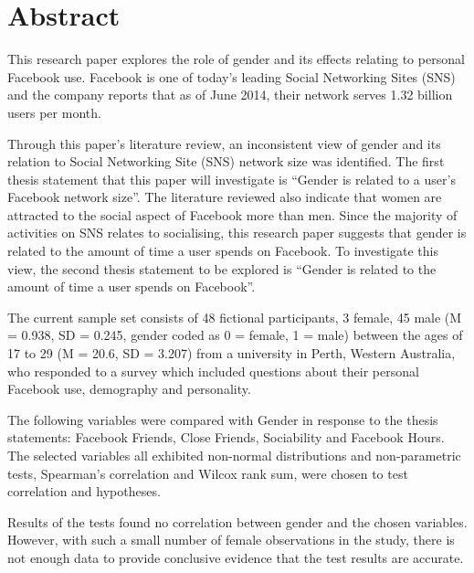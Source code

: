\section{Abstract}

This research paper explores the role of gender and its effects relating to personal Facebook use. Facebook is one of today's leading Social Networking Sites (SNS) and the company reports that as of June 2014, their network serves 1.32 billion users per month.

Through this paper's literature review, an inconsistent view of gender and its relation to Social Networking Site (SNS) network size was identified. The first thesis statement that this paper will investigate is ``Gender is related to a user's Facebook network size''. The literature reviewed also indicate that women are attracted to the social aspect of Facebook more than men. Since the majority of activities on SNS relates to socialising, this research paper suggests that gender is related to the amount of time a user spends on Facebook. To investigate this view, the second thesis statement to be explored is ``Gender is related to the amount of time a user spends on Facebook''.

The current sample set consists of 48 fictional participants, 3 female, 45 male (M = 0.938, SD = 0.245, gender coded as 0 = female, 1 = male) between the ages of 17 to 29 (M = 20.6, SD = 3.207) from a university in Perth, Western Australia, who responded to a survey which included questions about their personal Facebook use, demography and personality.

The following variables were compared with Gender in response to the thesis statements: Facebook Friends, Close Friends, Sociability and Facebook Hours. The selected variables all exhibited non-normal distributions and non-parametric tests, Spearman's correlation and Wilcox rank sum, were chosen to test correlation and hypotheses.

Results of the tests found no correlation between gender and the chosen variables. However, with such a small number of female observations in the study, there is not enough data to provide conclusive evidence that the test results are accurate.